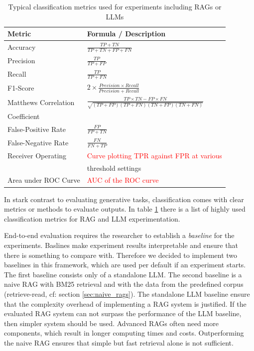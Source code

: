 {\renewcommand{\arraystretch}{1.5}%
\begin{table}
  \centering
 \begin{tabular}{|l|l|}
  \hline
  \textbf{Metric} & \textbf{Formula / Description} \\[3pt]
  \hline Accuracy & $\frac{TP + TN}{TP + TN + FP + FN}$\\[5pt]
  \hline Precision & $\frac{TP}{TP + FP}$\\[5pt]
  \hline Recall & $\frac{TP}{TP + FN}$\\[2pt]
  \hline F1-Score & $2 \times \frac{Precision \times Recall}{Precision + Recall}$\\[2pt]
  \hline Matthews Correlation & $\frac{TP \times TN - FP \times FN}{\sqrt{(TP + FP)(TP + FN)(TN + FP)(TN + FN)}}$\\Coefficient & \\[2pt]
  \hline False-Positive Rate & $\frac{FP}{FP + TN}$\\[2pt]
  \hline False-Negative Rate & $\frac{FN}{FN + TP}$\\[2pt]
  \hline Receiver Operating & \textcolor{red}{Curve plotting TPR against FPR at various} \\&threshold settings\\[2pt]
  \hline Area under ROC Curve &  \textcolor{red}{AUC of the ROC curve}\\[2pt]
  \hline
 \end{tabular}
 \caption{Typical classification metrics used for experiments including RAGs or LLMs\cite{Hou.8212023,Zeng.28.03.2024}}
 \label{table:classification_metrics}
\end{table}}

In stark contrast to evaluating generative tasks, classification comes with clear metrics or methods to evaluate outputs. In table \ref{table:classification_metrics} there is a list of highly used classification metrics for RAG and LLM experimentation.\cite{Hou.8212023,Zeng.28.03.2024} 

End-to-end evaluation requires the researcher to establish a \textit{baseline} for the experiments. Baslines make experiment results interpretable and ensure that there is something to compare with. Therefore we decided to implement two baselines in this framework, which are used per default if an experiment starts. The first baseline consists only of a standalone LLM. The second baseline is a naive RAG with BM25 retrieval and with the data from the predefined corpus (retrieve-read, cf: section \ref{sec:naive_rags}). The standalone LLM baseline ensure that the complexity overhead of implementing a RAG system is justified. If the evaluated RAG system can not surpass the performance of the LLM baseline, then simpler system should be used. Advanced RAGs often need more components, which result in longer computing times and costs. Outperforming the naive RAG ensures that simple but fast retrieval alone is not sufficient. 

